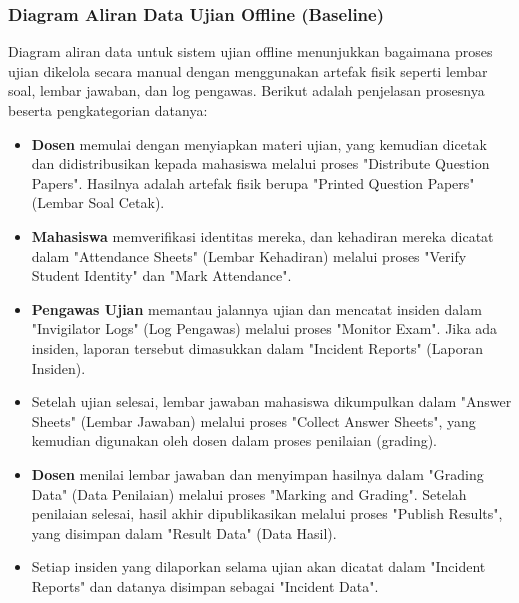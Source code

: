 \subsubsection{Diagram Aliran Data Ujian Offline (Baseline)}

Diagram aliran data untuk sistem ujian offline menunjukkan bagaimana proses ujian dikelola secara manual dengan menggunakan artefak fisik seperti lembar soal, lembar jawaban, dan log pengawas. Berikut adalah penjelasan prosesnya beserta pengkategorian datanya:

\begin{itemize}
	\item \textbf{Dosen} memulai dengan menyiapkan materi ujian, yang kemudian dicetak dan didistribusikan kepada mahasiswa melalui proses "Distribute Question Papers". Hasilnya adalah artefak fisik berupa "Printed Question Papers" (Lembar Soal Cetak).
	\item \textbf{Mahasiswa} memverifikasi identitas mereka, dan kehadiran mereka dicatat dalam "Attendance Sheets" (Lembar Kehadiran) melalui proses "Verify Student Identity" dan "Mark Attendance".
	\item \textbf{Pengawas Ujian} memantau jalannya ujian dan mencatat insiden dalam "Invigilator Logs" (Log Pengawas) melalui proses "Monitor Exam". Jika ada insiden, laporan tersebut dimasukkan dalam "Incident Reports" (Laporan Insiden).
	\item Setelah ujian selesai, lembar jawaban mahasiswa dikumpulkan dalam "Answer Sheets" (Lembar Jawaban) melalui proses "Collect Answer Sheets", yang kemudian digunakan oleh dosen dalam proses penilaian (grading).
	\item \textbf{Dosen} menilai lembar jawaban dan menyimpan hasilnya dalam "Grading Data" (Data Penilaian) melalui proses "Marking and Grading". Setelah penilaian selesai, hasil akhir dipublikasikan melalui proses "Publish Results", yang disimpan dalam "Result Data" (Data Hasil).
	\item Setiap insiden yang dilaporkan selama ujian akan dicatat dalam "Incident Reports" dan datanya disimpan sebagai "Incident Data".
\end{itemize}

